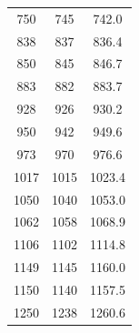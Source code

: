 \begin{table}[!htb]
\begin{minipage}[t]{0.5\textwidth}
\begin{tabular}{ccc}
      750  &  745  & 742.0 \\
      838  &  837  & 836.4 \\
      850  &  845  & 846.7 \\
      883  &  882  & 883.7 \\
      928  &  926  & 930.2 \\
      950  &  942  & 949.6 \\
      973  &  970  & 976.6  \\
      1017 &  1015 & 1023.4 \\
      1050 &  1040 & 1053.0 \\
      1062 &  1058 & 1068.9 \\
      1106 &  1102 & 1114.8 \\
      1149 &  1145 & 1160.0 \\
      1150 &  1140 & 1157.5 \\
      1250 &  1238 & 1260.6 \\
      \hline
    \end{tabular}

  \end{minipage}

\end{table}


